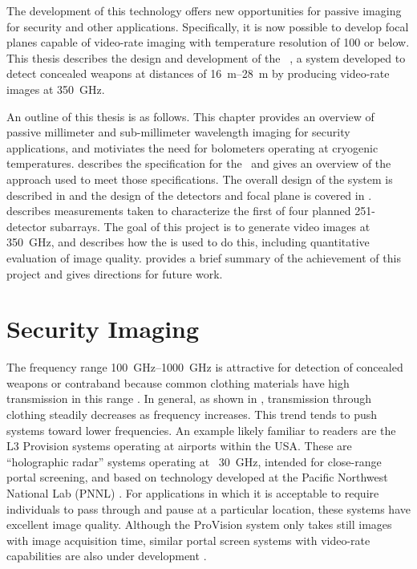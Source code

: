 The development of this technology offers new opportunities for passive imaging for security and other applications.
Specifically, it is now possible to develop focal planes capable of video-rate imaging with temperature resolution of \SI{100}{\mK} or below.
This thesis describes the design and development of the \NIST\ \Imager, a system developed to detect concealed weapons at distances of \SIrange{16}{28}{\m} by producing video-rate images at \SI{350}{\GHz}.

An outline of this thesis is as follows.
This chapter provides an overview of passive millimeter and sub-millimeter wavelength imaging for security applications, and motiviates the need for bolometers operating at cryogenic temperatures.
 describes the specification for the \Imager\ and gives an overview of the approach used to meet those specifications.
The overall design of the system is described in  and the design of the detectors and focal plane is covered in .
 describes measurements taken to characterize the first of four planned 251-detector subarrays.
The goal of this project is to generate video images at \SI{350}{\GHz}, and  describes how the \Imager is used to do this, including quantitative evaluation of image quality.
 provides a brief summary of the achievement of this project and gives directions for future work.

\section{Security Imaging}

The frequency range \SIrange{100}{1000}{\GHz} is attractive for detection of concealed weapons or contraband because common clothing materials have high transmission in this range \cite{bjarnason_millimeter-wave_2004}.
In general, as shown in , transmission through clothing steadily decreases as frequency increases.
This trend tends to push systems toward lower frequencies.
An example likely familiar to readers are the L3 Provision systems operating at airports within the USA.
These are ``holographic radar'' systems operating at ~\SI{30}{\GHz}, intended for close-range portal screening, and based on technology developed at the Pacific Northwest National Lab (PNNL) \cite{sheen_cylindrical_1998,mcmakin_dual-surface_2009}.
For applications in which it is acceptable to require individuals to pass through and pause at a particular location, these systems have excellent image quality.
Although the ProVision system only takes still images with  image acquisition time, similar portal screen systems with video-rate capabilities are also under development \cite{lyons_reflect-array_2013}.

